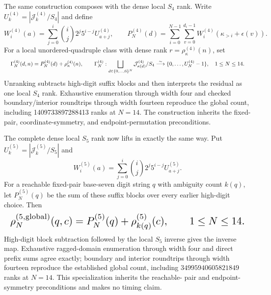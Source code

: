 \documentclass{article}
\newcommand{\fitmath}[1]{\resizebox{0.99\linewidth}{!}{$\displaystyle #1$}}
\begin{document}
The same construction composes with the dense local $S_4$ rank. Write
$U^{(4)}_k=|\mathcal J^{(4)}_k/S_4|$ and define
\[
  W^{(4)}_i(a)=\sum_{j=0}^{i}\binom{i}{j}2^j5^{i-j}U^{(4)}_{a+j},
  \qquad
  P^{(4)}_N(d)=\sum_{i=0}^{N-1}\sum_{v=0}^{d_i-1}
    W^{(4)}_i\!\left(\kappa_{>i}+\epsilon(v)\right).
\]
For a local unordered-quadruple class with dense rank
$r=\rho^{(4)}_\kappa(n)$, set
\begin{equation}
  \fitmath{%
    \Gamma^{(4)}_N(d,n)=P^{(4)}_N(d)+\rho^{(4)}_\kappa(n),
    \qquad
    \Gamma^{(4)}_N:
      \bigsqcup_{d\in\{0,\ldots,6\}^N}\mathcal J^{(4)}_{\kappa(d)}/S_4
      \overset{\sim}{\longrightarrow}\{0,\ldots,U^{(4)}_N-1\},
    \quad 1\leq N\leq14.
  }
  \label{eq:optimization-crazy-global-unordered-quadruple-ranking}
\end{equation}
Unranking subtracts high-digit suffix blocks and then interprets the residual
as one local $S_4$ rank. Exhaustive enumeration through width four and checked
boundary/interior roundtrips through width fourteen reproduce the global count,
including 1409733897288413 ranks at $N=14$. The construction inherits the
fixed-pair, coordinate-symmetry, and endpoint-permutation preconditions.

The complete dense local $S_5$ rank now lifts in exactly the same way. Put
$U^{(5)}_k=|\mathcal J^{(5)}_k/S_5|$ and
\[
  W^{(5)}_i(a)=\sum_{j=0}^{i}\binom{i}{j}2^j5^{i-j}U^{(5)}_{a+j}.
\]
For a reachable fixed-pair base-seven digit string $q$ with ambiguity count
$k(q)$, let $P^{(5)}_N(q)$ be the sum of these suffix blocks over every earlier
high-digit choice. Then
\begin{equation}
  \fitmath{%
    \rho^{(5,\mathrm{global})}_N(q,c)
      =P^{(5)}_N(q)+\rho^{(5)}_{k(q)}(c),
    \qquad 1\leq N\leq14.
  }
  \label{eq:optimization-crazy-global-unordered-quintuple-ranking}
\end{equation}
High-digit block subtraction followed by the local $S_5$ inverse gives the
inverse map. Exhaustive ragged-domain enumeration through width four and direct
prefix sums agree exactly; boundary and interior roundtrips through width
fourteen reproduce the established global count, including
$34995940605821849$ ranks at $N=14$. This specialization inherits the reachable-
pair and endpoint-symmetry preconditions and makes no timing claim.
\end{document}
